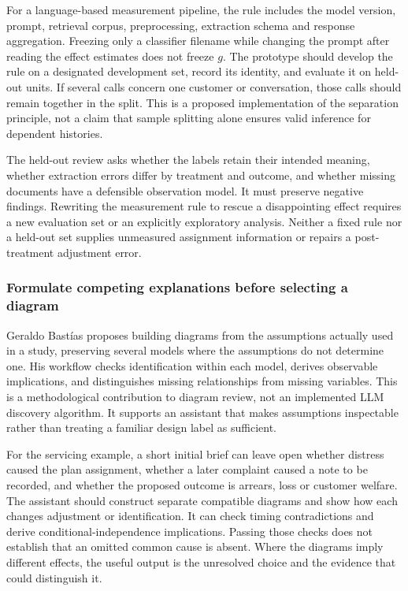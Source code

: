 For a language-based measurement pipeline, the rule includes the model
version, prompt, retrieval corpus, preprocessing, extraction schema and
response aggregation. Freezing only a classifier filename while changing
the prompt after reading the effect estimates does not freeze \(g\). The
prototype should develop the rule on a designated development set,
record its identity, and evaluate it on held-out units. If several calls
concern one customer or conversation, those calls should remain together
in the split. This is a proposed implementation of the separation
principle, not a claim that sample splitting alone ensures valid
inference for dependent histories.

The held-out review asks whether the labels retain their intended
meaning, whether extraction errors differ by treatment and outcome, and
whether missing documents have a defensible observation model. It must
preserve negative findings. Rewriting the measurement rule to rescue a
disappointing effect requires a new evaluation set or an explicitly
exploratory analysis. Neither a fixed rule nor a held-out set supplies
unmeasured assignment information or repairs a post-treatment adjustment
error.

\hypertarget{formulate-competing-explanations-before-selecting-a-diagram}{%
\subsubsection{Formulate competing explanations before selecting a
diagram}\label{formulate-competing-explanations-before-selecting-a-diagram}}

Geraldo Bastías proposes building diagrams from the assumptions actually
used in a study, preserving several models where the assumptions do not
determine one. His workflow checks identification within each model,
derives observable implications, and distinguishes missing relationships
from missing variables. This is a methodological contribution to diagram
review, not an implemented LLM discovery algorithm. It supports an
assistant that makes assumptions inspectable rather than treating a
familiar design label as sufficient. \citep{exec13_census_credible}

For the servicing example, a short initial brief can leave open whether
distress caused the plan assignment, whether a later complaint caused a
note to be recorded, and whether the proposed outcome is arrears, loss
or customer welfare. The assistant should construct separate compatible
diagrams and show how each changes adjustment or identification. It can
check timing contradictions and derive conditional-independence
implications. Passing those checks does not establish that an omitted
common cause is absent. Where the diagrams imply different effects, the
useful output is the unresolved choice and the evidence that could
distinguish it.

